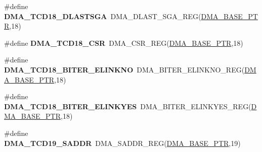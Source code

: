 \begin{DoxyCompactItemize}
\item 
\hypertarget{group___d_m_a___register___accessor___macros_ga75bce05291da9dbf16c032acdb090d9f}{}\#define {\bfseries D\+M\+A\+\_\+\+T\+C\+D18\+\_\+\+D\+L\+A\+S\+T\+S\+G\+A}~D\+M\+A\+\_\+\+D\+L\+A\+S\+T\+\_\+\+S\+G\+A\+\_\+\+R\+E\+G(\hyperlink{group___d_m_a___peripheral_ga6997fbc1b1973e9f27170217a3bd6f22}{D\+M\+A\+\_\+\+B\+A\+S\+E\+\_\+\+P\+T\+R},18)\label{group___d_m_a___register___accessor___macros_ga75bce05291da9dbf16c032acdb090d9f}

\item 
\hypertarget{group___d_m_a___register___accessor___macros_gafd13315f7a0f9878b9401efe5c676d8a}{}\#define {\bfseries D\+M\+A\+\_\+\+T\+C\+D18\+\_\+\+C\+S\+R}~D\+M\+A\+\_\+\+C\+S\+R\+\_\+\+R\+E\+G(\hyperlink{group___d_m_a___peripheral_ga6997fbc1b1973e9f27170217a3bd6f22}{D\+M\+A\+\_\+\+B\+A\+S\+E\+\_\+\+P\+T\+R},18)\label{group___d_m_a___register___accessor___macros_gafd13315f7a0f9878b9401efe5c676d8a}

\item 
\hypertarget{group___d_m_a___register___accessor___macros_ga69fe1dc79176c9fe74d5c24fecb07a9f}{}\#define {\bfseries D\+M\+A\+\_\+\+T\+C\+D18\+\_\+\+B\+I\+T\+E\+R\+\_\+\+E\+L\+I\+N\+K\+N\+O}~D\+M\+A\+\_\+\+B\+I\+T\+E\+R\+\_\+\+E\+L\+I\+N\+K\+N\+O\+\_\+\+R\+E\+G(\hyperlink{group___d_m_a___peripheral_ga6997fbc1b1973e9f27170217a3bd6f22}{D\+M\+A\+\_\+\+B\+A\+S\+E\+\_\+\+P\+T\+R},18)\label{group___d_m_a___register___accessor___macros_ga69fe1dc79176c9fe74d5c24fecb07a9f}

\item 
\hypertarget{group___d_m_a___register___accessor___macros_ga5a71644564f9236fc71a1d4602527668}{}\#define {\bfseries D\+M\+A\+\_\+\+T\+C\+D18\+\_\+\+B\+I\+T\+E\+R\+\_\+\+E\+L\+I\+N\+K\+Y\+E\+S}~D\+M\+A\+\_\+\+B\+I\+T\+E\+R\+\_\+\+E\+L\+I\+N\+K\+Y\+E\+S\+\_\+\+R\+E\+G(\hyperlink{group___d_m_a___peripheral_ga6997fbc1b1973e9f27170217a3bd6f22}{D\+M\+A\+\_\+\+B\+A\+S\+E\+\_\+\+P\+T\+R},18)\label{group___d_m_a___register___accessor___macros_ga5a71644564f9236fc71a1d4602527668}

\item 
\hypertarget{group___d_m_a___register___accessor___macros_ga9cae2cd443c30e7d194e89e86e3dff1c}{}\#define {\bfseries D\+M\+A\+\_\+\+T\+C\+D19\+\_\+\+S\+A\+D\+D\+R}~D\+M\+A\+\_\+\+S\+A\+D\+D\+R\+\_\+\+R\+E\+G(\hyperlink{group___d_m_a___peripheral_ga6997fbc1b1973e9f27170217a3bd6f22}{D\+M\+A\+\_\+\+B\+A\+S\+E\+\_\+\+P\+T\+R},19)\label{group___d_m_a___register___accessor___macros_ga9cae2cd443c30e7d194e89e86e3dff1c}


\end{DoxyCompactItemize}
